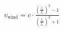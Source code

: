\documentclass[preview]{standalone}
\begin{document}
\begin{align*}
v_{\text{wind}} = c \cdot \frac{\left(\frac{f_{o}}{f_{s}}\right)^{2} - 1}{\left(\frac{f_{o}}{f_{s}}\right)^{2} + 1}
\end{align*}
\end{document}
